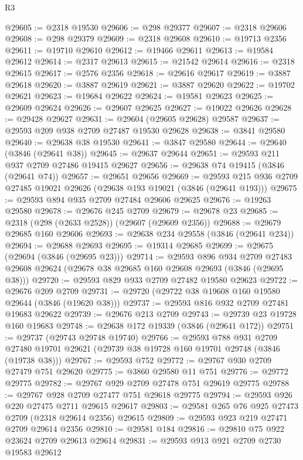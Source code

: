 \begin{lexlean}{R3}
\begin{coremodule}
@29605 := @2318 @19530
@29606 := @298 @29377
@29607 := @2318 @29606
@29608 := @298 @29379
@29609 := @2318 @29608
@29610 := @19713 @2356
@29611 := @19710 @29610
@29612 := @19466 @29611
@29613 := @19584 @29612
@29614 := @2317 @29613
@29615 := @21542 @29614
@29616 := @2318 @29615
@29617 := @2576 @2356
@29618 := @29616 @29617
@29619 := @3887 @29618
@29620 := @3887 @29619
@29621 := @3887 @29620
@29622 := @19702 @29621
@29623 := @19684 @29622
@29624 := @19581 @29623
@29625 := @29609 @29624
@29626 := @29607 @29625
@29627 := @19022 @29626
@29628 := @29428 @29627
@29631 := @29604 (@29605 @29628) @29587
@29637 := @29593 @209 @938 @2709 @27487 @19530 @29628
@29638 := @3841 @29580
@29640 := @29638 @38 @19530
@29641 := @3847 @29580
@29644 := @29640 (@3846 (@29641 @38))
@29645 := @29637 @29644
@29651 := @29593 @211 @937 @2709 @27486 @19415 @29627
@29656 := @29638 @74 @19415 (@3846 (@29641 @74))
@29657 := @29651 @29656
@29669 := @29593 @215 @936 @2709 @27485 @19021 @29626 (@29638 @193 @19021 (@3846 (@29641 @193)))
@29675 := @29593 @894 @935 @2709 @27484 @29606 @29625
@29676 := @19263 @29580
@29678 := @29676 @245 @2709
@29679 := @29678 @23
@29685 := @2318 (@298 (@2633 @2528)) (@29607 (@29609 @2356))
@29688 := @29679 @29685 @160 @29606
@29693 := @29638 @234 @29558 (@3846 (@29641 @234))
@29694 := @29688 @29693
@29695 := @19314 @29685
@29699 := @29675 (@29694 (@3846 (@29695 @23)))
@29714 := @29593
    @896
    @934
    @2709
    @27483
    @29608
    @29624
    (@29678 @38 @29685 @160 @29608 @29693 (@3846 (@29695 @38)))
@29720 := @29593 @829 @933 @2709 @27482 @19580 @29623
@29722 := @29676 @209 @2709
@29731 := @29720 (@29722 @38 @19608 @160 @19580 @29644 (@3846 (@19620 @38)))
@29737 := @29593 @816 @932 @2709 @27481 @19683 @29622
@29739 := @29676 @213 @2709
@29743 := @29739 @23 @19728 @160 @19683
@29748 := @29638 @172 @19339 (@3846 (@29641 @172))
@29751 := @29737 (@29743 @29748 @19740)
@29766 := @29593
    @788
    @931
    @2709
    @27480
    @19701
    @29621
    (@29739 @38 @19728 @160 @19701 @29748 (@3846 (@19738 @38)))
@29767 := @29593 @752
@29772 := @29767 @930 @2709 @27479 @751 @29620
@29775 := @3860 @29580 @11 @751
@29776 := @29772 @29775
@29782 := @29767 @929 @2709 @27478 @751 @29619 @29775
@29788 := @29767 @928 @2709 @27477 @751 @29618 @29775
@29794 := @29593 @926 @220 @27475 @2711 @29615 @29617
@29803 := @29581 @265 @76 @925 @27473 @2709 (@2318 @29614 @2356) @29615
@29809 := @29593 @923 @219 @27471 @2709 @29614 @2356
@29810 := @29581 @184
@29816 := @29810 @75 @922 @23624 @2709 @29613 @29614
@29831 := @29593
    @913
    @921
    @2709
    @2730
    @19583
    @29612

\end{coremodule}
\end{lexlean}
